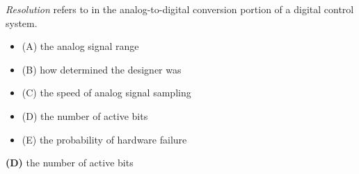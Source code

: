 

{\it Resolution} refers to \underbar{\hskip 50pt} in the analog-to-digital conversion portion of a digital control system.

\begin{itemize}
\item{(A)} the analog signal range
\vskip 5pt 
\item{(B)} how determined the designer was 
\vskip 5pt 
\item{(C)} the speed of analog signal sampling
\vskip 5pt 
\item{(D)} the number of active bits
\vskip 5pt 
\item{(E)} the probability of hardware failure 
\end{itemize}







{\bf (D)} the number of active bits
 










